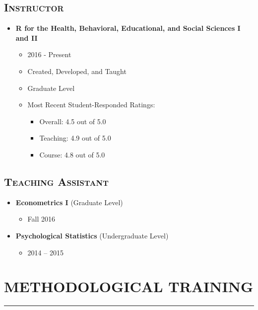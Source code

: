 \documentclass[]{DissertateUSU}
\providecommand{\tightlist}{%
  \setlength{\itemsep}{0pt}\setlength{\parskip}{0pt}}
\begin{document}
\tocless\subsection{\textsc{Instructor}}

\begin{itemize}
\tightlist
\item
  \textbf{R for the Health, Behavioral, Educational, and Social Sciences
  I and II}

  \begin{itemize}
  \tightlist
  \item
    2016 - Present
  \item
    Created, Developed, and Taught
  \item
    Graduate Level
  \item
    Most Recent Student-Responded Ratings:

    \begin{itemize}
    \tightlist
    \item
      Overall: 4.5 out of 5.0
    \item
      Teaching: 4.9 out of 5.0
    \item
      Course: 4.8 out of 5.0
    \end{itemize}
  \end{itemize}
\end{itemize}

\vspace{10pt} \tocless\subsection{\textsc{Teaching Assistant}}

\begin{itemize}
\tightlist
\item
  \textbf{Econometrics I} (Graduate Level)

  \begin{itemize}
  \tightlist
  \item
    Fall 2016
  \end{itemize}
\item
  \textbf{Psychological Statistics} (Undergraduate Level)

  \begin{itemize}
  \tightlist
  \item
    2014 -- 2015
  \end{itemize}
\end{itemize}

\vspace{20pt} \tocless\section{METHODOLOGICAL TRAINING} \vspace{-10pt}
\hrule
\end{document}
